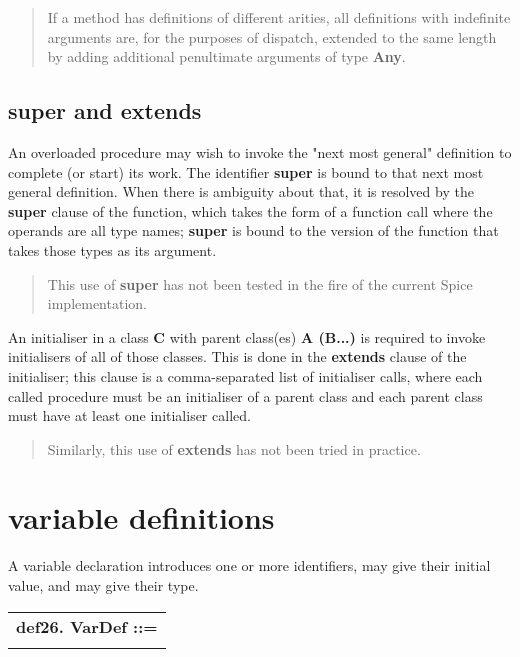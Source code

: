 \documentclass{report}
\begin{document}
\begin{quote}If a method has definitions of different arities, all definitions with
indefinite arguments are, for the purposes of dispatch, extended to the same
length by adding additional penultimate arguments of type {\bf Any}.\end{quote}

\subsection{super and extends}


An overloaded procedure may wish to invoke the "next most general" definition
to complete (or start) its work. The identifier {\bf super} is bound to that
next most general definition. When there is ambiguity about that, it is
resolved by the {\bf super} clause of the function, which takes the form of a
function call where the operands are all type names; {\bf super} is bound to the
version of the function that takes those types as its argument.

\begin{quote}This use of {\bf super} has not been tested in the fire of the
    current Spice implementation.
\end{quote}

An initialiser in a class {\bf C} with parent class(es) {\bf A (B...)} is
required to invoke initialisers of all of those classes. This is done in
the {\bf extends} clause of the initialiser; this clause is a comma-separated list
of initialiser calls, where each called procedure must be an initialiser
of a parent class and each parent class must have at least one initialiser
called.

\begin{quote}Similarly, this use of {\bf extends} has not been tried in practice.
\end{quote}

\section{variable definitions}


A variable declaration introduces one or more identifiers, may give
their initial value, and may give their type.

\begin{tabular}{l}
{\bf def26. VarDef ::= }\\ 
\hspace*{3mm}{\tt MarkedModifier ("const" $\mid$ "var") NameDecl} \\ 
\end{tabular}
\end{document}
